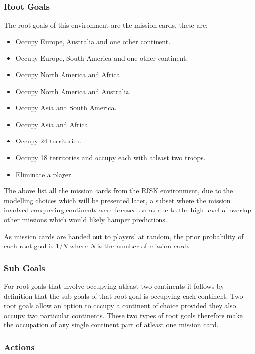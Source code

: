 \documentclass[parskip]{cs4rep}
\begin{document}
\subsubsection{Root Goals}

The root goals of this environment are the mission cards, these are:

\begin{itemize}
\item
Occupy Europe, Australia and one other continent.
\item
Occupy Europe, South America and one other continent.
\item
Occupy North America and Africa.
\item
Occupy North America and Australia.
\item
Occupy Asia and South America.
\item
Occupy Asia and Africa.
\item
Occupy 24 territories.
\item
Occupy 18 territories and occupy each with atleast two troops.
\item
Eliminate a player.
\newline
\end{itemize}

The above list all the mission cards from the RISK environment, due to the modelling choices which will be presented later, a subset where the mission involved conquering continents were focused on as due to the high level of overlap other missions which would likely hamper predictions.

As mission cards are handed out to players' at random, the prior probability of each root goal is 1/\textit{N} where \textit{N} is the number of mission cards.

\subsubsection{Sub Goals}

For root goals that involve occupying atleast two continents it follows by definition that the sub goals of that root goal is occupying each continent. Two root goals allow an option to occupy a continent of choice provided they also occupy two particular continents. These two types of root goals therefore make the occupation of any single continent part of atleast one mission card.

\subsubsection{Actions}
\end{document}
